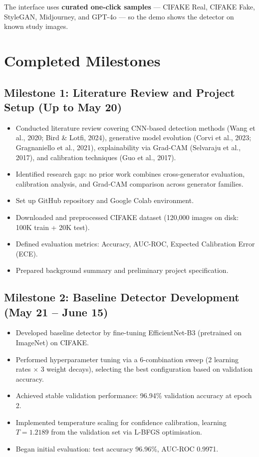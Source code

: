 \documentclass[12pt,a4paper]{article}
\begin{document}
The interface uses \textbf{curated one-click samples} --- CIFAKE Real, CIFAKE Fake, StyleGAN, Midjourney, and GPT-4o --- so the demo shows the detector on known study images.

\section{Completed Milestones}

\subsection{Milestone 1: Literature Review and Project Setup (Up to May 20)}

\begin{itemize}[noitemsep]
    \item Conducted literature review covering CNN-based detection methods (Wang et al., 2020; Bird \& Lotfi, 2024), generative model evolution (Corvi et al., 2023; Gragnaniello et al., 2021), explainability via Grad-CAM (Selvaraju et al., 2017), and calibration techniques (Guo et al., 2017).
    \item Identified research gap: no prior work combines cross-generator evaluation, calibration analysis, and Grad-CAM comparison across generator families.
    \item Set up GitHub repository and Google Colab environment.
    \item Downloaded and preprocessed CIFAKE dataset (120,000 images on disk: 100K train + 20K test).
    \item Defined evaluation metrics: Accuracy, AUC-ROC, Expected Calibration Error (ECE).
    \item Prepared background summary and preliminary project specification.
\end{itemize}

\subsection{Milestone 2: Baseline Detector Development (May 21 -- June 15)}

\begin{itemize}[noitemsep]
    \item Developed baseline detector by fine-tuning EfficientNet-B3 (pretrained on ImageNet) on CIFAKE.
    \item Performed hyperparameter tuning via a 6-combination sweep (2 learning rates $\times$ 3 weight decays), selecting the best configuration based on validation accuracy.
    \item Achieved stable validation performance: 96.94\% validation accuracy at epoch 2.
    \item Implemented temperature scaling for confidence calibration, learning $T = 1.2189$ from the validation set via L-BFGS optimisation.
    \item Began initial evaluation: test accuracy 96.96\%, AUC-ROC 0.9971.
\end{itemize}
\end{document}
